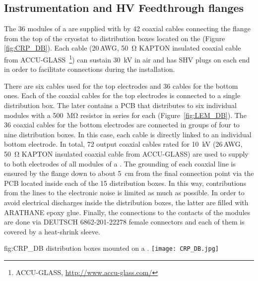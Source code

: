 \subsection{Instrumentation and HV Feedthrough flanges}
\label{sec:fddp-crp-intfc-FT}
The \num{36}  modules of a  are supplied with  by \num{42} coaxial cables 
connecting the \fdth flange from the top of the cryostat to distribution boxes located on the  (Figure \ref{fig:CRP_DB}). Each cable (\num{20}\,AWG, \SI{50}{\ohm} KAPTON insulated coaxial cable from ACCU-GLASS~\footnote{ACCU-GLASS\texttrademark{}, \url{http://www.accu-glass.com/}}) can sustain \SI{30}{kV} in air and has SHV plugs on each end in order to facilitate connections during the  installation.

There are six cables used for the  top electrodes and \num{36} cables for the bottom ones. Each of the coaxial cables for the  top electrodes is connected to a single distribution box. The later contains a PCB that %
distributes  to six individual  modules with a \SI{500}{\mega\ohm} resistor in series for each 
 (Figure~\ref{fig:LEM_DB}). The \num{36} coaxial cables for the  bottom electrodes are connected in groups of four to nine distribution boxes. In this case, each  cable is directly linked to an individual  bottom electrode. In total, \num{72} output coaxial cables rated for \SI{10}{kV} (\num{26}\,AWG, \SI{50}{\ohm} KAPTON insulated coaxial cable from ACCU-GLASS) are used to supply  to both electrodes of all  modules of a . The grounding of each coaxial line is ensured by the \fdth flange down to about \SI{5}{cm} from the  final connection point via the PCB located inside each of the \num{15} distribution boxes. In this way, contributions from the  lines to the electronic noise is limited as much as possible. In order to avoid electrical discharges inside the distribution boxes, the latter are filled with ARATHANE epoxy glue. Finally, the connections to the  contacts of the  modules are done via  DEUTSCH 6862-201-22278 female connectors and each of them is covered by a heat-shrink sleeve. 

\begin{dunefigure}
{fig:CRP_DB} 
{  distribution boxes mounted on a . }
  \texttt{[image: CRP\_DB.jpg]}
\end{dunefigure}


